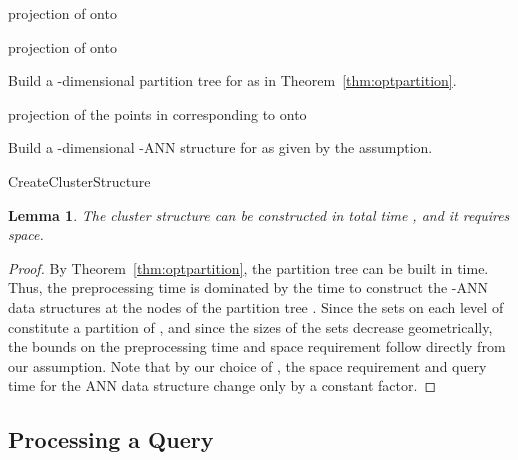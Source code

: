 \documentclass[a4paper,11pt]{paper}
\newtheorem{lemma}[theorem]{Lemma}
\newenvironment{alg}{\begin{algorithm}[htbp]}{\end{algorithm}}
\begin{document}
\begin{alg}

   projection of  onto 

   projection of  onto 

  Build a -dimensional partition tree  for 
   as in Theorem~\ref{thm:optpartition}.

  

   {
       projection of the points in 
      corresponding to  onto 

      Build a -dimensional -ANN structure for 
      as given by the assumption.
}
 \caption{CreateClusterStructure}
 \label{alg:preprocessCluster}
\end{alg}

\begin{lemma}\label{lem:clusterPrep}
  The cluster structure can be constructed in total
  time  , and it requires
    space.
\end{lemma}
\begin{proof}
By Theorem~\ref{thm:optpartition}, the partition tree can be
built in  time. Thus,
the preprocessing time is dominated by the time to
construct the -ANN data structures at the nodes
of the partition tree .
Since the sets on each level of  constitute a
partition of , and since the sizes of the sets decrease
geometrically, the bounds on the preprocessing time and
space requirement follow directly from our assumption.
Note that by our choice of , the
space requirement and query time for the
ANN data structure change only by a constant factor.
\end{proof}

\subsection{Processing a Query}
\end{document}
